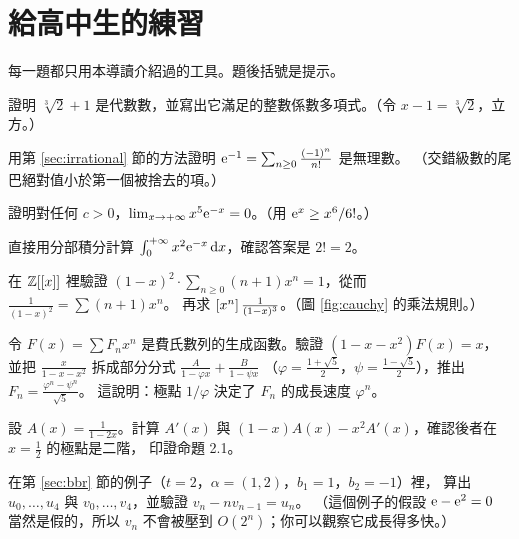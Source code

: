 \section{給高中生的練習}

每一題都只用本導讀介紹過的工具。題後括號是提示。

\begin{exer}
證明 $\sqrt[3]{2}+1$ 是代數數，並寫出它滿足的整數係數多項式。（令 $x-1=\sqrt[3]2$，立方。）
\end{exer}

\begin{exer}
用第 \ref{sec:irrational} 節的方法證明 $\mathrm{e}^{-1}=\sum_{n\ge0}\frac{(-1)^n}{n!}$ 是無理數。
（交錯級數的尾巴絕對值小於第一個被捨去的項。）
\end{exer}

\begin{exer}
證明對任何 $c>0$，$\lim_{x\to+\infty}x^{5}\mathrm{e}^{-x}=0$。（用 $\mathrm{e}^{x}\ge x^6/6!$。）
\end{exer}

\begin{exer}
直接用分部積分計算 $\int_0^{+\infty}x^{2}\mathrm{e}^{-x}\,\mathrm{d} x$，確認答案是 $2!=2$。
\end{exer}

\begin{exer}
在 $\mathbb{Z}[[x]]$ 裡驗證 $(1-x)^2\cdot\sum_{n\ge0}(n+1)x^n=1$，從而 $\frac{1}{(1-x)^2}=\sum(n+1)x^n$。
再求 $[x^{n}]\,\frac{1}{(1-x)^3}$。（圖 \ref{fig:cauchy} 的乘法規則。）
\end{exer}

\begin{exer}
令 $F(x)=\sum F_nx^n$ 是費氏數列的生成函數。驗證 $(1-x-x^2)F(x)=x$，
並把 $\frac{x}{1-x-x^2}$ 拆成部分分式 $\frac{A}{1-\varphi x}+\frac{B}{1-\psi x}$
（$\varphi=\frac{1+\sqrt5}{2}$，$\psi=\frac{1-\sqrt5}{2}$），推出 $F_n=\frac{\varphi^n-\psi^n}{\sqrt5}$。
這說明：極點 $1/\varphi$ 決定了 $F_n$ 的成長速度 $\varphi^n$。
\end{exer}

\begin{exer}
設 $A(x)=\frac{1}{1-2x}$。計算 $A'(x)$ 與 $(1-x)A(x)-x^2A'(x)$，確認後者在 $x=\frac12$ 的極點是二階，
印證命題 2.1。
\end{exer}

\begin{exer}
在第 \ref{sec:bbr} 節的例子（$t=2$，$\alpha=(1,2)$，$b_1=1$，$b_2=-1$）裡，
算出 $u_0,\ldots,u_4$ 與 $v_0,\ldots,v_4$，並驗證 $v_n-nv_{n-1}=u_n$。
（這個例子的假設 $\mathrm{e}-\mathrm{e}^2=0$ 當然是假的，所以 $v_n$ 不會被壓到 $O(2^n)$；你可以觀察它成長得多快。）
\end{exer}

